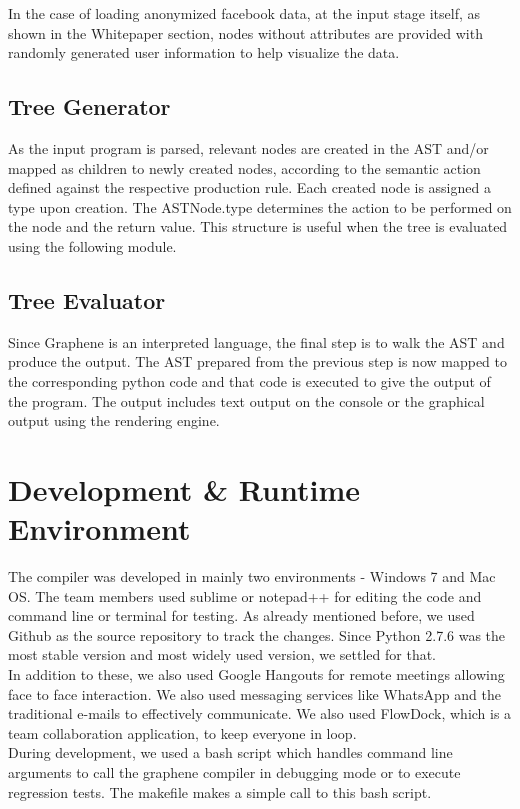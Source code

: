 \documentclass[a4paper]{article}
\begin{document}
\noindent In the case of loading anonymized facebook data, at the input stage itself, as shown in the Whitepaper section, nodes without attributes are provided with randomly generated user information to help visualize the data.


\subsection{Tree Generator}
As the input program is parsed, relevant nodes are created in the AST and/or mapped as children to newly created nodes, according to the semantic action defined against the respective production rule. Each created node is assigned a type upon creation. The ASTNode.type determines the action to be performed on the node and the return value. This structure is useful when the tree is evaluated using the following module.

\subsection{Tree Evaluator}
Since Graphene is an interpreted language, the final step is to walk the AST and produce the output. The AST prepared from the previous step is now mapped to the corresponding python code and that code is executed to give the output of the program. The output includes text output on the console or the graphical output using the rendering engine.


\newpage
\section{Development \& Runtime Environment}
The compiler was developed in mainly two environments - Windows 7 and Mac OS. The team members used sublime or notepad++ for editing the code and command line or terminal for testing. As already mentioned before, we used Github as the source repository to track the changes. Since Python 2.7.6 was the most stable version and most widely used version, we settled for that.\\

\noindent In addition to these, we also used Google Hangouts for remote meetings allowing face to face interaction. We also used messaging services like WhatsApp and the traditional e-mails to effectively communicate. We also used FlowDock, which is a team collaboration application, to keep everyone in loop.\\

\noindent During development, we used a bash script which handles command line arguments to call the graphene compiler in debugging mode or to execute regression tests. The makefile makes a simple call to this bash script.\\
\end{document}
